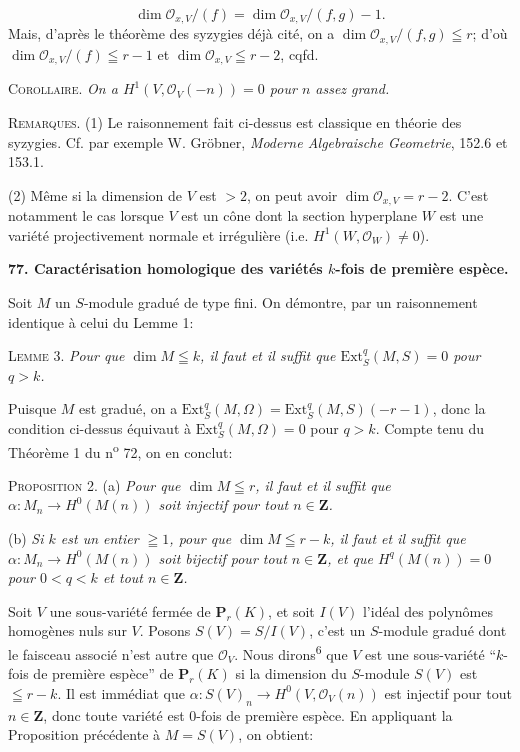 \begin{equation*}
\dim \mathcal{O}_{x,V}/(f) = \dim \mathcal{O}_{x,V}/(f, g) - 1.
\end{equation*}
Mais, d'après le théorème des syzygies déjà cité, on a $\dim \mathcal{O}_{x,V}/(f, g) \leqq r$; d'où $\dim \mathcal{O}_{x,V}/(f) \leqq r - 1$ et $\dim \mathcal{O}_{x,V} \leqq r - 2$, cqfd.

\textsc{Corollaire}. \textit{On a $H^1(V, \mathcal{O}_V(-n)) = 0$ pour $n$ assez grand.}

\textsc{Remarques}. (1) Le raisonnement fait ci-dessus est classique en théorie des syzygies. Cf. par exemple W. Gröbner, \textit{Moderne Algebraische Geometrie}, 152.6 et 153.1.

(2) Même si la dimension de $V$ est $>2$, on peut avoir $\dim \mathcal{O}_{x,V} = r - 2$. C'est notamment le cas lorsque $V$ est un cône dont la section hyperplane $W$ est une variété projectivement normale et irrégulière (i.e. $H^1(W, \mathcal{O}_W) \neq 0$).


\textbf{77. Caractérisation homologique des variétés $k$-fois de première espèce.}

Soit $M$ un $S$-module gradué de type fini. On démontre, par un raisonnement identique à celui du Lemme 1:

\textsc{Lemme} 3. \textit{Pour que $\dim M \leqq k$, il faut et il suffit que $\mathrm{Ext}^q_S(M, S) = 0$ pour $q > k$.}

Puisque $M$ est gradué, on a $\mathrm{Ext}^q_S(M, \Omega) = \mathrm{Ext}^q_S(M, S)(-r - 1)$, donc la condition ci-dessus équivaut à $\mathrm{Ext}^q_S(M, \Omega) = 0$ pour $q > k$. Compte tenu du Théorème 1 du n\textsuperscript{o} 72, on en conclut:

\textsc{Proposition} 2. (a) \textit{Pour que $\dim M \leqq r$, il faut et il suffit que $\alpha : M_n \to H^0(M(n))$ soit injectif pour tout $n \in \mathbf{Z}$.}

(b) \textit{Si $k$ est un entier $\geqq 1$, pour que $\dim M \leqq r - k$, il faut et il suffit que $\alpha : M_n \to H^0(M(n))$ soit bijectif pour tout $n \in \mathbf{Z}$, et que $H^q(M(n)) = 0$ pour $0 < q < k$ et tout $n \in \mathbf{Z}$.}

Soit $V$ une sous-variété fermée de $\mathbf{P}_r(K)$, et soit $I(V)$ l'idéal des polynômes homogènes nuls sur $V$. Posons $S(V) = S/I(V)$, c'est un $S$-module gradué dont le faisceau associé n'est autre que $\mathcal{O}_V$. Nous dirons\textsuperscript{6} que $V$ est une sous-variété ``$k$-fois de première espèce'' de $\mathbf{P}_r(K)$ si la dimension du $S$-module $S(V)$ est $\leqq r - k$. Il est immédiat que $\alpha : S(V)_n \to H^0(V, \mathcal{O}_V(n))$ est injectif pour tout $n \in \mathbf{Z}$, donc toute variété est $0$-fois de première espèce. En appliquant la Proposition précédente à $M = S(V)$, on obtient:

